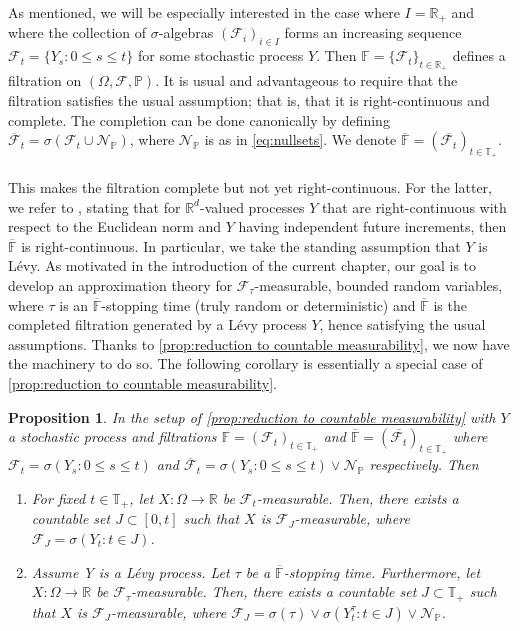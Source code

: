 \documentclass[11pt]{report}
\theoremstyle{plain} %
\newtheorem{proposition}[proposition]{Proposition}
\theoremstyle{definition} %
\theoremstyle{remark} %
\begin{document}
As mentioned, we will be especially interested in the case where \(I=\mathbb{R}_+\) and where the collection of \(\sigma\)-algebras \((\mathcal{F}_i)_{i\in I }\) forms an increasing sequence \(\mathcal{F}_t=\{Y_s:0\leq s\leq t\}\) for some stochastic process \(Y\). Then \(\mathbb{F}=\{\mathcal{F}_t\}_{t\in\mathbb{R}_+}\) defines a filtration on \((\Omega,\mathcal{F},\mathbb{P})\). It is usual and advantageous to require that the filtration satisfies the usual assumption; that is, that it is right-continuous and complete. The completion can be done canonically by defining \(\mathcal{\overline{F}}_t=\sigma(\mathcal{F}_t\cup\mathcal{N}_{\mathbb{P}})\), where \(\mathcal{N}_{\mathbb{P}}\) is as in \cref{eq:nullsets}. We denote \(\overline{\mathbb{F}}=(\overline{\mathcal{F}_t})_{t\in\mathbb{T}_+}\).
\\\\
This makes the filtration complete but not yet right-continuous. For the latter, we refer to \parencite[Rem.~3.23.]{Schmock2024LectureNotes}, stating that for \(\mathbb{R}^d\)-valued processes \(Y\) that are right-continuous with respect to the Euclidean norm and \(Y\) having independent future increments, then \(\overline{\mathbb{F}}\) is right-continuous. In particular, we take the standing assumption that \(Y\) is Lévy. 
\bigbreak
As motivated in the introduction of the current chapter, our goal is to develop an approximation theory for \(\mathcal{F_{\tau}}\)-measurable, bounded random variables, where \(\tau\) is an \(\overline{\mathbb{F}}\)-stopping time (truly random or deterministic) and \(\overline{\mathbb{F}}\) is the completed filtration generated by a Lévy process \(Y\), hence satisfying the usual assumptions. 
Thanks to \cref{prop:reduction to countable measurability}, we now have the machinery to do so. The following corollary is essentially a special case of \cref{prop:reduction to countable measurability}. 
\begin{proposition}\label{prop:reduction to countable measurability with filtration}
    In the setup of \cref{prop:reduction to countable measurability} with \(Y\) a stochastic process and filtrations \(\mathbb{F}=(\mathcal{F}_t)_{t\in\mathbb{T}_+}\) and \(\overline{\mathbb{F}}=(\overline{\mathcal{F}_t})_{t\in\mathbb{T}_+}\) where \(\mathcal{F}_t=\sigma(Y_s:0\leq s\leq t)\) and \(\overline{\mathcal{F}}_t=\sigma(Y_s:0\leq s\leq t)\vee\mathcal{N}_{\mathbb{P}}\) respectively. Then
    \begin{enumerate}[label=(\alph*)]
        \item For fixed \(t\in\mathbb{T}_+\), let \(X:\Omega\to\mathbb{R}\) be \(\mathcal{F}_t\)-measurable. Then, there exists a \textit{countable} set \(J\subset [0,t]\) such that \(X\) is \(\mathcal{F}_J\)-measurable, where \(\mathcal{F}_J = \sigma(Y_t:t\in J)\). 
        \item Assume Y is a Lévy process. Let \(\tau\) be a \(\overline{\mathbb{F}}\)-stopping time. Furthermore, let \(X:\Omega\to\mathbb{R}\) be \(\mathcal{F}_{\tau}\)-measurable. Then, there exists a countable set \(J\subset\mathbb{T}_+\) such that \(X\) is \(\mathcal{F}_J\)-measurable, where \(\mathcal{F}_J=\sigma(\tau)\vee\sigma(Y_t^{\tau}:t\in J)\vee \mathcal{N}_{\mathbb{P}}\).
    \end{enumerate}
\end{proposition}
\end{document}
